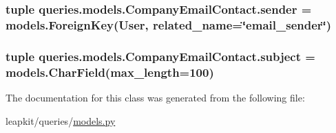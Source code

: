 \hypertarget{classqueries_1_1models_1_1_company_email_contact_a0a818b791cc30ac3c64ebbc3fd43e32b}{
\subsubsection[{sender}]{\setlength{\rightskip}{0pt plus 5cm}tuple queries.\-models.\-Company\-Email\-Contact.\-sender = models.\-Foreign\-Key(User, related\-\_\-name=\char`\"{}email\-\_\-sender\char`\"{})\hspace{0.3cm}{\ttfamily [static]}}}\label{classqueries_1_1models_1_1_company_email_contact_a0a818b791cc30ac3c64ebbc3fd43e32b}
\hypertarget{classqueries_1_1models_1_1_company_email_contact_ad46e14645bd327c60c41ffc0f3414df2}{
\subsubsection[{subject}]{\setlength{\rightskip}{0pt plus 5cm}tuple queries.\-models.\-Company\-Email\-Contact.\-subject = models.\-Char\-Field(max\-\_\-length=100)\hspace{0.3cm}{\ttfamily [static]}}}\label{classqueries_1_1models_1_1_company_email_contact_ad46e14645bd327c60c41ffc0f3414df2}


The documentation for this class was generated from the following file\-:\begin{DoxyCompactItemize}
\item 
leapkit/queries/\hyperlink{queries_2models_8py}{models.\-py}\end{DoxyCompactItemize}
